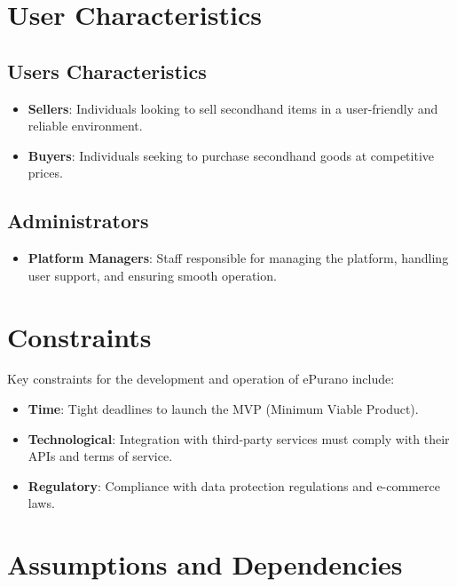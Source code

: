 \section{User Characteristics}

\subsection{Users Characteristics}

\begin{itemize}
    \item \textbf{Sellers}: Individuals looking to sell secondhand items in a user-friendly and reliable environment.
    \item \textbf{Buyers}: Individuals seeking to purchase secondhand goods at competitive prices.
\end{itemize}

\subsection{Administrators}

\begin{itemize}
    \item \textbf{Platform Managers}: Staff responsible for managing the platform, handling user support, and ensuring smooth operation.
\end{itemize}

\section{Constraints}

Key constraints for the development and operation of ePurano include:

\begin{itemize}
    \item \textbf{Time}: Tight deadlines to launch the MVP (Minimum Viable Product).
    \item \textbf{Technological}: Integration with third-party services must comply with their APIs and terms of service.
    \item \textbf{Regulatory}: Compliance with data protection regulations and e-commerce laws.
\end{itemize}

\section{Assumptions and Dependencies}

